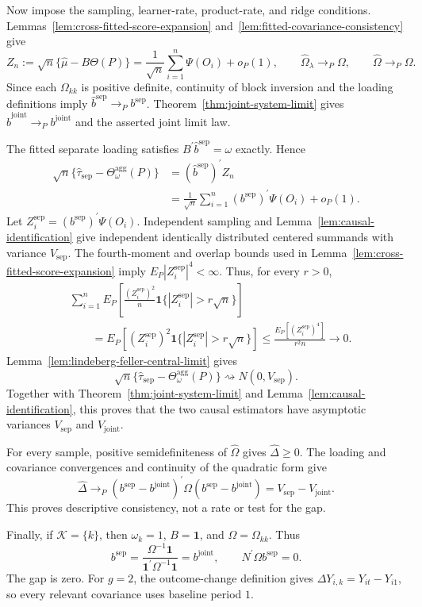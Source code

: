 Now impose the sampling, learner-rate, product-rate, and ridge conditions. Lemmas~\ref{lem:cross-fitted-score-expansion} and~\ref{lem:fitted-covariance-consistency} give
\[
 Z_n:=\sqrt n\{\widehat\mu-B\Theta(P)\}
 =\frac1{\sqrt n}\sum_{i=1}^n\Psi(O_i)+o_P(1),
 \qquad
 \widehat\Omega_\lambda\to_P\Omega,
 \qquad
 \widehat\Omega\to_P\Omega.
\]
Since each \(\Omega_{kk}\) is positive definite, continuity of block inversion and the loading definitions imply \(\widehat b^{\mathrm{sep}}\to_Pb^{\mathrm{sep}}\). Theorem~\ref{thm:joint-system-limit} gives \(\widehat b^{\mathrm{joint}}\to_Pb^{\mathrm{joint}}\) and the asserted joint limit law.

The fitted separate loading satisfies \(B^{\prime}\widehat b^{\mathrm{sep}}=\omega\) exactly. Hence
\[
\begin{aligned}
 \sqrt n\{\widehat\tau_{\mathrm{sep}}-
 \Theta_\omega^{\mathrm{agg}}(P)\}
 &=(\widehat b^{\mathrm{sep}})^{\prime}Z_n\\
 &=\frac1{\sqrt n}\sum_{i=1}^n
 (b^{\mathrm{sep}})^{\prime}\Psi(O_i)+o_P(1).
\end{aligned}
\]
Let \(Z_i^{\mathrm{sep}}=(b^{\mathrm{sep}})^{\prime}\Psi(O_i)\). Independent sampling and Lemma~\ref{lem:causal-identification} give independent identically distributed centered summands with variance \(V_{\mathrm{sep}}\). The fourth-moment and overlap bounds used in Lemma~\ref{lem:cross-fitted-score-expansion} imply \(E_P|Z_i^{\mathrm{sep}}|^4<\infty\). Thus, for every \(r>0\),
\[
\begin{aligned}
 &\sum_{i=1}^nE_P\!\left[
 \frac{(Z_i^{\mathrm{sep}})^2}{n}
 \mathbf 1\{|Z_i^{\mathrm{sep}}|>r\sqrt n\}\right]\\
 &\qquad=E_P[(Z_i^{\mathrm{sep}})^2
 \mathbf 1\{|Z_i^{\mathrm{sep}}|>r\sqrt n\}]
 \le\frac{E_P[(Z_i^{\mathrm{sep}})^4]}{r^2n}\longrightarrow0.
\end{aligned}
\]
Lemma~\ref{lem:lindeberg-feller-central-limit} gives
\[
 \sqrt n\{\widehat\tau_{\mathrm{sep}}-
 \Theta_\omega^{\mathrm{agg}}(P)\}
 \rightsquigarrow N(0,V_{\mathrm{sep}}).
\]
Together with Theorem~\ref{thm:joint-system-limit} and Lemma~\ref{lem:causal-identification}, this proves that the two causal estimators have asymptotic variances \(V_{\mathrm{sep}}\) and \(V_{\mathrm{joint}}\).

For every sample, positive semidefiniteness of \(\widehat\Omega\) gives \(\widehat\Delta\ge0\). The loading and covariance convergences and continuity of the quadratic form give
\[
 \widehat\Delta\to_P
 (b^{\mathrm{sep}}-b^{\mathrm{joint}})^{\prime}
 \Omega(b^{\mathrm{sep}}-b^{\mathrm{joint}})
 =V_{\mathrm{sep}}-V_{\mathrm{joint}}.
\]
This proves descriptive consistency, not a rate or test for the gap.

Finally, if \(\mathcal K=\{k\}\), then \(\omega_k=1\), \(B=\mathbf 1\), and \(\Omega=\Omega_{kk}\). Thus
\[
 b^{\mathrm{sep}}
 =\frac{\Omega^{-1}\mathbf 1}
 {\mathbf 1^{\prime}\Omega^{-1}\mathbf 1}
 =b^{\mathrm{joint}},
 \qquad
 N^{\prime}\Omega b^{\mathrm{sep}}=0.
\]
The gap is zero. For \(g=2\), the outcome-change definition gives \(\Delta Y_{i,k}=Y_{it}-Y_{i1}\), so every relevant covariance uses baseline period \(1\).